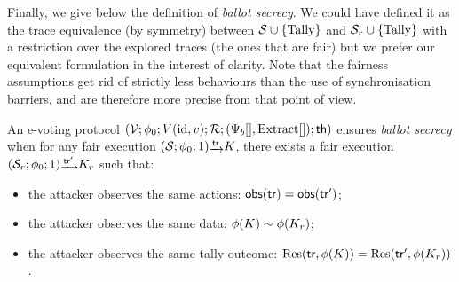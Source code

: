 Finally, we give below the definition of {\em ballot secrecy}. We could have defined it
as the trace equivalence (by symmetry) between $\mathcal{S}\cup\{\mathrm{Tally}\}$ and $\mathcal{S}_r\cup\{\mathrm{Tally}\}$
with a restriction over the explored traces (\ie the ones that are fair) but we prefer
our equivalent formulation in the interest of clarity. Note that the fairness assumptions get rid of strictly less
behaviours than the use of synchronisation barriers, and are therefore more precise from that point of view.

\begin{definition}
\label{def:ballot-sec}
  An e-voting protocol
  $(\mathcal{V};
  \phi_0; 
  V(\mathrm{id},v);
  \mathcal{R};
  (\Psi_b[],\mathrm{Extract}[]);
  \mathsf{th})$ ensures {\em ballot secrecy} when 
  for any fair execution $(\S;\phi_0;1)\sint{\tr}K$,
  there exists a fair execution $(\S_r;\phi_0;1)\sint{\tr'}K_r$ such that:
  \begin{itemize}
  \item the attacker observes the same actions: $\mathsf{obs}(\mathsf{tr}) = \mathsf{obs}(\mathsf{tr}')$;
  \item the attacker observes the same data: $\phi(K) \sim \phi(K_r)$;
  \item the attacker observes the same tally outcome: 
    $\mathrm{Res}(\mathsf{tr},\phi(K))= \mathrm{Res}(\mathsf{tr}',\phi(K_r))$.
  \end{itemize}
\end{definition}

